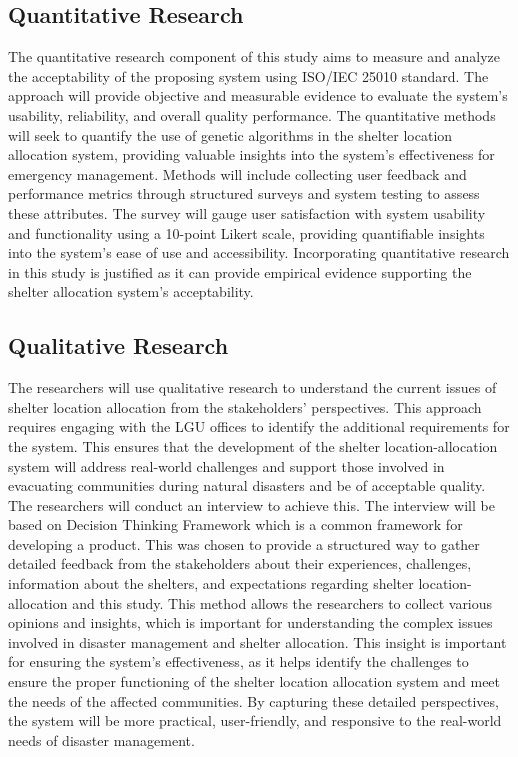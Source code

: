\subsection{Quantitative Research}
	The quantitative research component of this study aims to measure and analyze the acceptability of the proposing system using ISO/IEC 25010 standard. The approach will provide objective and measurable evidence to evaluate the system's usability, reliability, and overall quality performance. The quantitative methods will seek to quantify the use of genetic algorithms in the shelter location allocation system, providing valuable insights into the system's effectiveness for emergency management.
	Methods will include collecting user feedback and performance metrics through structured surveys and system testing to assess these attributes. The survey will gauge user satisfaction with system usability and functionality using a 10-point Likert scale, providing quantifiable insights into the system's ease of use and accessibility. 
	Incorporating quantitative research in this study is justified as it can provide empirical evidence supporting the shelter allocation system's acceptability. 

\subsection{Qualitative Research}
	The researchers will use qualitative research to understand the current issues of shelter location allocation from the stakeholders' perspectives. This approach requires engaging with the LGU offices to identify the additional requirements for the system. This ensures that the development of the shelter location-allocation system will address real-world challenges and support those involved in evacuating communities during natural disasters and be of acceptable quality.
	The researchers will conduct an interview to achieve this. The interview will be based on Decision Thinking Framework which is a common framework for developing a product. This was chosen to provide a structured way to gather detailed feedback from the stakeholders about their experiences, challenges, information about the shelters, and expectations regarding shelter location-allocation and this study. This method allows the researchers to collect various opinions and insights, which is important for understanding the complex issues involved in disaster management and shelter allocation.
	This insight is important for ensuring the system's effectiveness, as it helps identify the challenges to ensure the proper functioning of the shelter location allocation system and meet the needs of the affected communities. By capturing these detailed perspectives, the system will be more practical, user-friendly, and responsive to the real-world needs of disaster management.


